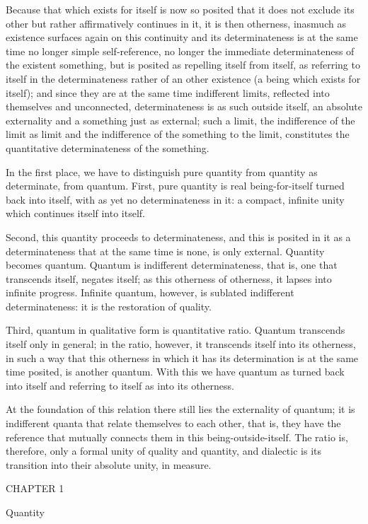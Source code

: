 Because that which exists for itself is now so posited
that it does not exclude its other
but rather affirmatively continues in it,
it is then otherness, inasmuch as
existence surfaces again on this continuity
and its determinateness is at the same time
no longer simple self-reference,
no longer the immediate determinateness
of the existent something,
but is posited as repelling itself from itself,
as referring to itself in the determinateness
rather of an other existence
(a being which exists for itself);
and since they are at the same time indifferent limits,
reflected into themselves and unconnected,
determinateness is as such outside itself,
an absolute externality and a something just as external;
such a limit, the indifference of the limit as limit
and the indifference of the something to the limit,
constitutes the quantitative determinateness of the something.

In the first place, we have to distinguish pure quantity
from quantity as determinate, from quantum.
First, pure quantity is real being-for-itself
turned back into itself, with as yet no determinateness in it:
a compact, infinite unity which continues itself into itself.

Second, this quantity proceeds to determinateness,
and this is posited in it as a determinateness
that at the same time is none, is only external.
Quantity becomes quantum.
Quantum is indifferent determinateness,
that is, one that transcends itself, negates itself;
as this otherness of otherness, it lapses into infinite progress.
Infinite quantum, however, is sublated indifferent determinateness:
it is the restoration of quality.

Third, quantum in qualitative form is quantitative ratio.
Quantum transcends itself only in general;
in the ratio, however, it transcends itself into its otherness,
in such a way that this otherness in which it has its determination
is at the same time posited, is another quantum.
With this we have quantum as turned back into itself
and referring to itself as into its otherness.

At the foundation of this relation there still
lies the externality of quantum;
it is indifferent quanta that
relate themselves to each other,
that is, they have the reference
that mutually connects them
in this being-outside-itself.
The ratio is, therefore, only
a formal unity of quality and quantity,
and dialectic is its transition into
their absolute unity, in measure.

CHAPTER 1

Quantity

